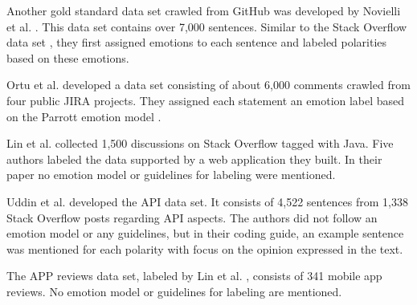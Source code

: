 Another gold standard data set crawled from GitHub was developed by Novielli et al. \cite{novielligold.2020}. This data set contains over 7,000 sentences. Similar to the Stack Overflow data set \cite{Novielli.2018b}, they first assigned emotions to each sentence and labeled polarities based on these emotions.

Ortu et al. \cite{Ortu.2016} developed a data set consisting of about 6,000 comments crawled from four public JIRA projects. They assigned each statement an emotion label based on the Parrott emotion model \cite{parrott2001emotions}.

Lin et al. \cite{10.1145/3180155.3180195} collected 1,500 discussions on Stack Overflow tagged with Java. Five authors labeled the data supported by a web application they built. In their paper no emotion model or guidelines for labeling were mentioned.

Uddin et al. \cite{8643972} developed the API data set. It consists of 4,522 sentences from 1,338 Stack Overflow posts regarding API aspects. The authors did not follow an emotion model or any guidelines, but in their coding guide, an example sentence was mentioned for each polarity with focus on the opinion expressed in the text. 

The APP reviews data set, labeled by Lin et al. \cite{10.1145/3180155.3180195}, consists of 341 mobile app reviews. No emotion model or guidelines for labeling are mentioned.